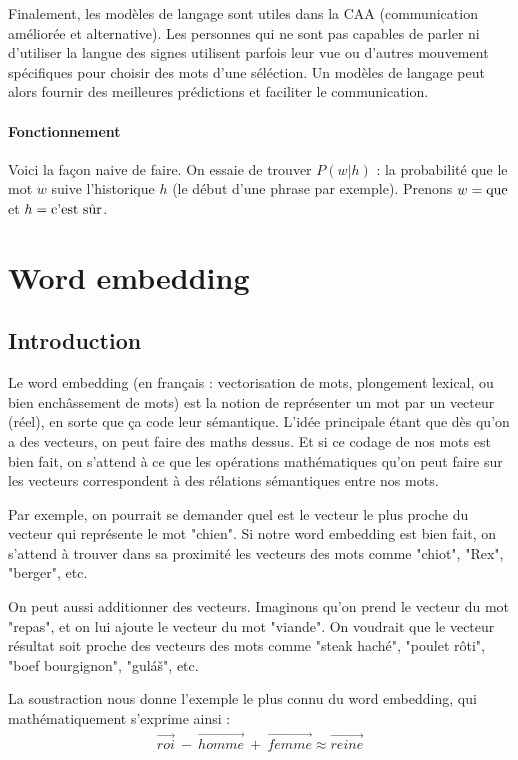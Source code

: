 \documentclass[11pt, a4paper]{report}
\begin{document}
  Finalement, les modèles de langage sont utiles dans la CAA (communication améliorée et 
  alternative). Les personnes qui ne sont pas capables de parler ni d'utiliser la langue des 
  signes utilisent parfois leur vue ou d'autres mouvement spécifiques pour choisir des mots 
  d'une séléction. Un modèles de langage peut alors fournir des meilleures prédictions et 
  faciliter le communication. 

  \subsubsection{Fonctionnement}
  Voici la façon naive de faire. On essaie de trouver $P(w|h)$ : la probabilité que le mot 
  $w$ suive l'historique $h$ (le début d'une phrase par exemple). Prenons $w = \textup{que}$ et 
  $h = \textup{c'est sûr}$.  

\chapter{Word embedding}
  \section{Introduction}
  \cite{wikipedia-wembedding} \cite{wikipedia-wembedding-fr} Le word embedding (en français : vectorisation de mots, plongement lexical, ou bien enchâssement de mots)
est la notion de représenter un mot par un vecteur (réel), en sorte que ça code leur sémantique.
L'idée principale étant que dès qu'on a des vecteurs, on peut faire des maths dessus. Et si ce 
codage de nos mots est bien fait, on s'attend à ce que les opérations mathématiques qu'on peut 
faire sur les vecteurs correspondent à des rélations sémantiques entre nos mots. 

Par exemple, on pourrait se demander quel est le vecteur le plus proche du vecteur qui représente 
le mot "chien". Si notre word embedding est bien fait, on s'attend à trouver dans sa proximité 
les vecteurs des mots comme "chiot", "Rex", "berger", etc. 

On peut aussi additionner des vecteurs. Imaginons qu'on prend le vecteur du mot "repas", et on lui 
ajoute le vecteur du mot "viande". On voudrait que le vecteur résultat soit proche des vecteurs 
des mots comme "steak haché", "poulet rôti", "boef bourgignon", "guláš", etc. 

La soustraction nous donne l'exemple le plus connu du word embedding, qui mathématiquement 
s'exprime ainsi : 
\begin{align*}
  \overrightarrow{roi} \ - \ \overrightarrow{homme} \ + \ \overrightarrow{femme} \approx \overrightarrow{reine}
\end{align*}
\end{document}
